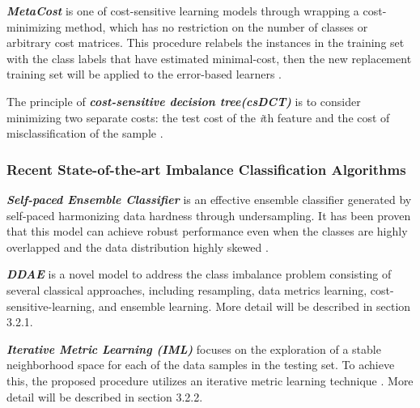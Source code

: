 \textbf{\textit{MetaCost}} \cite{23} is one of cost-sensitive learning models through wrapping a cost-minimizing method, which has no restriction on the number of classes or arbitrary cost matrices. This procedure relabels the instances in the training set with the class labels that have estimated minimal-cost, then the new replacement training set will be applied to the error-based learners \cite{23}.

The principle of \textbf{\textit{cost-sensitive decision tree(csDCT)}} is to consider minimizing two separate costs: the test cost of the \textit{i}th feature and the cost of misclassification of the sample \cite{10}.

\subsubsection{Recent State-of-the-art Imbalance Classification Algorithms}
\textbf{\textit{Self-paced Ensemble Classifier}} \cite{96} is an effective ensemble classifier generated by self-paced harmonizing data hardness through undersampling. It has been proven that this model can achieve robust performance even when the classes are highly overlapped and the data distribution highly skewed \cite{96}.

\textbf{\textit{DDAE}} \cite{73} is a novel model to address the class imbalance problem consisting of several classical approaches, including resampling, data metrics learning, cost-sensitive-learning, and ensemble learning. More detail will be described in section 3.2.1.

\textbf{\textit{Iterative Metric Learning (IML)}} \cite{72} focuses on the exploration of a stable neighborhood space for each of the data samples in the testing set. To achieve this, the proposed procedure utilizes an iterative metric learning technique \cite{72}. More detail will be described in section 3.2.2.

